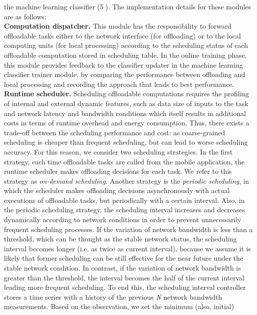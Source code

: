 \documentclass[10pt, conference, compsocconf]{IEEEtran}
\begin{document}
the machine learning classifier ({\textcircled{5}).
%
The implementation details for these modules are as follows:\\
%
\textbf{Computation dispatcher.} This module has the
responsibility to forward offloadable tasks either to the
network interface (for offloading) or to the local computing units (for
local processing) according to the scheduling status of each offloadable
computation stored in scheduling table.
%
In the online training phase, this module provides feedback to the
classifier updater in the machine learning classifier trainer module, by
comparing the performance between offloading and local processing and
recording the approach that leads to best performance.\\
%
\textbf{Runtime scheduler.} Scheduling offloadable computations
requires the profiling of internal and external dynamic features, such
as data size of inputs to the task and network latency and bandwidth
conditions which itself results in additional costs in terms of runtime
overhead and energy consumption.
%
Thus, there exists a trade-off between the scheduling performance and
cost: as coarse-grained scheduling is cheaper than frequent
scheduling, but can lead to worse scheduling accuracy.    
%
For this reason, we consider two scheduling strategies.
%
In the first strategy, each time offloadable tasks are called from the
mobile application, the runtime scheduler makes offloading decisions for
each task.
%
We refer to this strategy as \textit{on-demand scheduling}.
%
Another strategy is the \textit{periodic scheduling}, in which the
scheduler makes offloading decisions asynchronously with actual
executions of offloadable tasks, but periodically with a certain
interval.
%
Also, in the periodic scheduling strategy, the scheduling interval
increases and decreases dynamically according to network conditions in
order to prevent unnecessarily frequent scheduling processes.
%
If the variation of network bandwidth is less than a threshold, which
can be thought as the stable network status, the scheduling interval 
becomes longer (i.e. as twice as current interval), because we assume it
is likely that former scheduling can be still effective for the near
future under the stable network condition.
%
In contrast, if the variation of network bandwidth is greater than the
threshold, the interval becomes the half of the current interval leading
more frequent scheduling.
%
To end this, the scheduling interval controller stores a time series
with a history of the previous \textit{N} network bandwidth
measurements.
%
Based on the observation, we set the minimum (also, initial)
}
\end{document}
